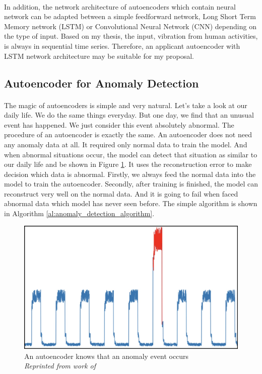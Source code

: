 \paragraph{}
In addition, the network architecture of autoencoders which contain neural network can be adapted between a simple feedforward network, Long Short Term Memory network (LSTM) or Convolutional Neural Network (CNN) depending on the type of input. Based on my thesis, the input, vibration from human activities, is always in sequential time series. Therefore, an applicant autoencoder with LSTM network architecture may be suitable for my proposal.

\subsection{Autoencoder for Anomaly Detection}
\paragraph{}
The magic of autoencoders is simple and very natural. Let’s take a look at our daily life. We do the same things everyday. But one day, we find that an unusual event has happened. We just consider this event absolutely abnormal. The procedure of an autoencoder is exactly the same. An autoencoder does not need any anomaly data at all. It required only normal data to train the model. And when abnormal situations occur, the model can detect that situation as similar to our daily life and be shown in Figure \ref{fig:ae_detection}. It uses the reconstruction error to make decision which data is abnormal. Firstly, we always feed the normal data into the model to train the autoencoder. Secondly, after training is finished, the model can reconstruct very well on the normal data. And it is going to fail when faced abnormal data which model has never seen before. The simple algorithm is shown in Algorithm \ref{al:anomaly_detection_algorithm}.

\begin{figure}[H]
  \centering
  \caption[An autoencoder knows that an anomaly event occurs]{An autoencoder knows that an anomaly event occurs \\\hspace{\textwidth} \emph{Reprinted from work of \citeauthor{pavithrasv_2020} \citeyear{pavithrasv_2020}}}\label{fig:ae_detection}
  \includegraphics[scale = 0.2]{figures/ae_detection.jpg}  
\end{figure}

